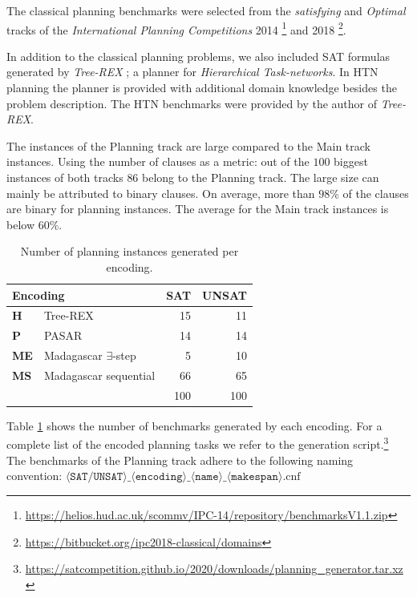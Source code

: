 \documentclass{elsarticle}
\begin{document}
The classical planning benchmarks were selected from the \emph{satisfying} and
\emph{Optimal} tracks of the \emph{International Planning Competitions} 2014
\footnote{\url{https://helios.hud.ac.uk/scommv/IPC-14/repository/benchmarksV1.1.zip}}
and 2018 \footnote{\url{https://bitbucket.org/ipc2018-classical/domains}}.

In addition to the classical planning problems, we also included SAT formulas
generated by \emph{Tree-REX} \cite{TreeRex19}; a planner for \emph{Hierarchical
  Task-networks}. In HTN planning the planner is provided with additional domain
knowledge besides the problem description. The HTN benchmarks were provided by
the author of \emph{Tree-REX}.

The instances of the Planning track are large compared to the Main track
instances. Using the number of clauses as a metric: out of the $100$ biggest
instances of both tracks
$86$ belong to the Planning track. The large size can mainly be attributed to
binary clauses. On average, more than $98$\% of the clauses are binary for
planning instances. The average for the Main track instances is below $60$\%.

\begin{table}[t]
\centering\small
\begin{tabular}{llrr}
\multicolumn{2}{l}{Encoding} & SAT& UNSAT\\
\hline\arrayrulecolor{lightgray}
\textbf{H}  & Tree-REX & 15 & 11\\
\textbf{P}  & PASAR & 14 & 14\\
\textbf{ME} & Madagascar $\exists$-step & 5 & 10\\
\textbf{MS} & Madagascar sequential & 66 & 65\\
\hline
&& 100 & 100\\
\end{tabular}
\label{tab:planningBenchmarkDist}
\caption{Number of planning instances generated per encoding.}
\end{table}

Table \ref{tab:planningBenchmarkDist} shows the number of benchmarks generated
by each encoding. 
For a complete list of the encoded planning tasks we refer to the
generation script.\footnote{\url{https://satcompetition.github.io/2020/downloads/planning_generator.tar.xz}} 
The benchmarks of the Planning track adhere to the following naming convention:
${\langle \texttt{SAT/UNSAT} \rangle\_\langle \texttt{encoding} \rangle\_\langle
  \texttt{name} \rangle\_\langle \texttt{makespan}
  \rangle\text{.cnf}}$
\end{document}

